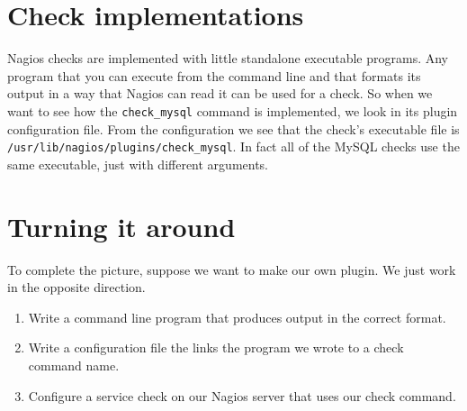 \documentclass{article}         %
\begin{document}
\section{Check implementations}
Nagios checks are implemented with little standalone executable programs. Any program that you can execute from the command line and that formats its output in a way that Nagios can read it can be used for a check. So when we want to see how the \texttt{check\_mysql} command is implemented, we look in its plugin configuration file. From the configuration we see that the check's executable file is \texttt{/usr/lib/nagios/plugins/check\_mysql}. In fact all of the MySQL checks use the same executable, just with different arguments.

\section{Turning it around}
To complete the picture, suppose we want to make our own plugin. We just work in the opposite direction.

\begin{enumerate}
  \item Write a command line program that produces output in the correct format.
  \item Write a configuration file the links the program we wrote to a check command name.
  \item Configure a service check on our Nagios server that uses our check command.
\end{enumerate}
\end{document}
